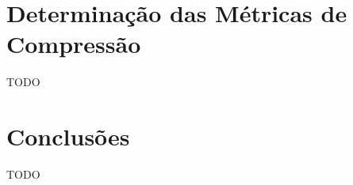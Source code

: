 \section{Determinação das Métricas de Compressão}
\label{sec::imp-test:psnr}

TODO



\section{Conclusões}
\label{sec::imp-test:conclusao}

TODO
